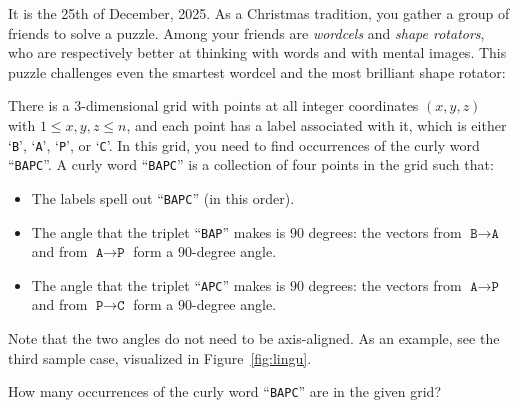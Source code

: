 

\newcommand{\maxn}{22}
\newcommand{\threeD}{$3$-dimensional }

It is the 25th of December, 2025.
As a Christmas tradition, you gather a group of friends to solve a puzzle.
Among your friends are \emph{wordcels} and \emph{shape rotators},
who are respectively better at thinking with words and with mental images.
This puzzle challenges even the smartest wordcel and the most brilliant shape rotator:

There is a \threeD grid with points at all integer coordinates $(x,y,z)$ with $1\leq x,y,z\leq n$,
and each point has a label associated with it, which is either `\texttt{B}', `\texttt{A}', `\texttt{P}', or `\texttt{C}'.
In this grid, you need to find occurrences of the curly word ``\texttt{BAPC}''.
A curly word ``\texttt{BAPC}'' is a collection of four points in the grid such that:

\begin{itemize}
    \item The labels spell out ``\texttt{BAPC}'' (in this order).
    \item The angle that the triplet ``\texttt{BAP}'' makes is $90$ degrees: the vectors from $\texttt{B}\to \texttt{A}$ and from $\texttt{A}\to \texttt{P}$ form a $90$-degree angle.
    \item The angle that the triplet ``\texttt{APC}'' makes is $90$ degrees: the vectors from $\texttt{A}\to \texttt{P}$ and from $\texttt{P}\to \texttt{C}$ form a $90$-degree angle.
\end{itemize}

Note that the two angles do not need to be axis-aligned.
As an example, see the third sample case, visualized in Figure~\ref{fig:lingu}.

How many occurrences of the curly word ``\texttt{BAPC}'' are in the given grid?

